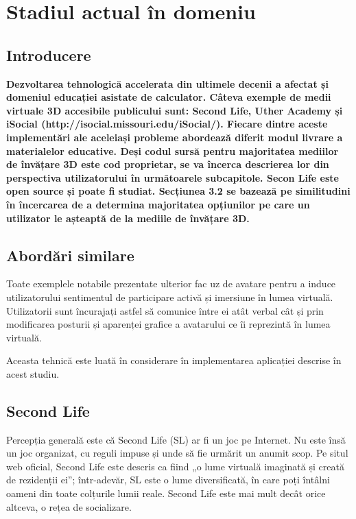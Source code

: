 \chapter{Stadiul actual în domeniu}

\section{Introducere}

\textbf{ Dezvoltarea tehnologică accelerata din ultimele decenii a afectat și domeniul educației asistate de calculator. Câteva exemple de medii virtuale 3D accesibile publicului sunt: Second Life,  Uther Academy și iSocial (http://isocial.missouri.edu/iSocial/). Fiecare dintre aceste implementări ale aceleiași probleme abordează diferit modul livrare a materialelor educative. Deși codul sursă pentru majoritatea mediilor de învățare 3D este cod proprietar, se va încerca descrierea lor din perspectiva utilizatorului în următoarele subcapitole. Secon Life este open source și poate fi studiat. Secțiunea 3.2 se bazează pe similitudini în încercarea de a determina majoritatea opțiunilor pe care un utilizator le așteaptă de la mediile de învățare 3D.}


\section{Abordări similare}

\par Toate exemplele notabile prezentate ulterior fac uz de avatare pentru a induce utilizatorului sentimentul de participare activă și imersiune în lumea virtuală. Utilizatorii sunt încurajați astfel să comunice între ei atât verbal cât și prin modificarea posturii și aparenței grafice a avatarului ce îi reprezintă în lumea virtuală.
\par Aceasta tehnică este luată în considerare în implementarea aplicației descrise în acest studiu.

\section{Second Life}
\par Percepția generală este că Second Life (SL) ar fi un joc pe Internet. Nu este însă un joc organizat, cu reguli impuse și unde să fie urmărit un anumit scop. Pe situl web oficial, Second Life este descris ca fiind „o lume virtuală imaginată și creată de rezidenții ei”; într-adevăr, SL este o lume diversificată, în care poți întâlni oameni din toate colțurile lumii reale. Second Life este mai mult decât orice altceva, o rețea de socializare.

